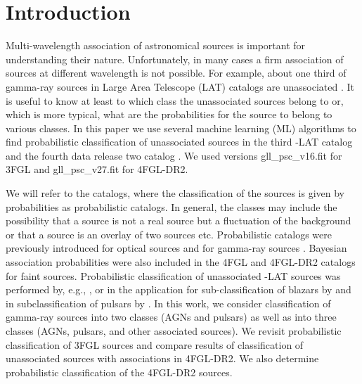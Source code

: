 \section{Introduction}

Multi-wavelength association of astronomical sources is important for understanding their nature.
Unfortunately, in many cases a firm association of sources at different wavelength is not possible.
For example, about one third of gamma-ray sources in \Fermi Large Area Telescope (LAT) catalogs are unassociated
\citep{2010ApJS..188..405A, 2012ApJS..199...31N, 2015ApJS..218...23A, 2020ApJS..247...33A}.
It is useful to know at least to which class the unassociated sources belong to or, which is more typical,
what are the probabilities for the source to belong to various classes.
In this paper we use several machine learning (ML) algorithms to find probabilistic classification of
unassociated sources in the third \Fermi-LAT catalog \citep[3FGL,][]{2015ApJS..218...23A} and the fourth data release two catalog
\citep[4FGL-DR2,][]{2020ApJS..247...33A, 2020arXiv200511208B}. We used  versions gll\_psc\_v16.fit for 3FGL
and  gll\_psc\_v27.fit for 4FGL-DR2.

We will refer to the catalogs, where the classification of the sources is given by probabilities as probabilistic catalogs.
In general, the classes may include the possibility that a source is not a real source but a fluctuation of the background 
or that a source is an overlay of two sources etc.
Probabilistic catalogs
were previously introduced for optical sources 
\citep[e.g.,][]{2010EAS....45..351H, 2013AJ....146....7B}
and for gamma-ray sources \citep{2017ApJ...839....4D}.
Bayesian association probabilities were also included in the 4FGL \citep{2020ApJS..247...33A} and
4FGL-DR2 \citep{2020arXiv200511208B} catalogs for faint sources.
Probabilistic classification of unassociated \Fermi-LAT sources was performed by, e.g.,
\cite{2012ApJ...753...83A, 2016ApJ...820....8S, 2016ApJ...825...69M, 2017A&A...602A..86L, 2020MNRAS.492.5377L, 
2020arXiv201205251F, 2021RAA....21...15Z},
or in the application for sub-classification of blazars by
\cite{2013MNRAS.428..220H, 2014ApJ...782...41D, 2016MNRAS.462.3180C, 2017MNRAS.470.1291S, 2019MNRAS.490.4770K, 2020MNRAS.493.1926K}
and in subclassification of pulsars by \cite{2012MNRAS.424.2832L, 2016ApJ...820....8S}.
In this work, we consider classification of gamma-ray sources into two classes (AGNs and pulsars) as well as into three classes 
(AGNs, pulsars, and other associated sources).
We revisit probabilistic classification of 3FGL sources and compare results of classification of unassociated sources
with associations in 4FGL-DR2.
We also determine probabilistic classification of the 4FGL-DR2 sources.


